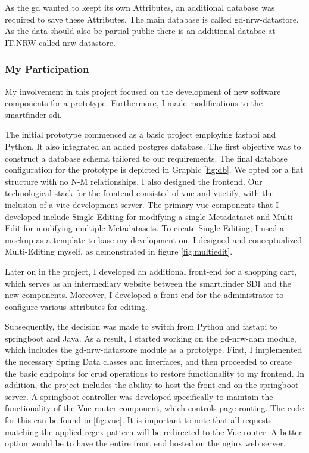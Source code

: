 \documentclass[11pt, titlepage, a4paper]{article}
\begin{document}

As the \gls{gd}  wanted to keept its own Attributes, an additional database was required to save these Attributes. The main database is called gd-nrw-datastore. As the data should also be partial public there is an additional databse at IT.NRW called nrw-datastore. %



\subsubsection{My Participation}
My involvement in this project focused on the development of new software components for a prototype. Furthermore, I made modifications to the smartfinder-sdi.



The initial prototype commenced as a basic project employing \Gls{fastapi} and Python. It also integrated an added \Gls{postgres} database. The first objective was to construct a database schema tailored to our requirements. The final database configuration for the prototype is depicted in Graphic \ref{fig:db}. We opted for a flat structure with no N-M relationships.
I also designed the frontend. Our technological stack for the frontend consisted of \Gls{vue} and \Gls{vuetify}, with the inclusion of a \Gls{vite} development server. The primary \Gls{vue} components that I developed include Single Editing for modifying a single Metadataset and Multi-Edit for modifying multiple Metadatasets. To create Single Editing, I used a mockup as a template to base my development on. I designed and conceptualized Multi-Editing myself, as demonstrated in figure \ref{fig:multiedit}.

Later on in the project, I developed an additional front-end for a shopping cart, which serves as an intermediary website between the smart.finder SDI and the new components. Moreover, I developed a front-end for the administrator to configure various attributes for editing.




Subsequently, the decision was made to switch from Python and \Gls{fastapi} to \Gls{springboot} and Java. As a result, I started working on the gd-nrw-dam module, which includes the gd-nrw-datastore module as a prototype. First, I implemented the necessary Spring Data classes and interfaces, and then proceeded to create the basic endpoints for \gls{crud} operations to restore functionality to my frontend. In addition, the project includes the ability to host the front-end on the \Gls{springboot} server. A \Gls{springboot} controller was developed specifically to maintain the functionality of the Vue router component, which controls page routing. The code for this can be found in
\ref{fig:vue}. It is important to note that all requests matching the applied regex pattern will be redirected to the Vue router. A better option would be to have the entire front end hosted on the \Gls{nginx} web server.
\end{document}
